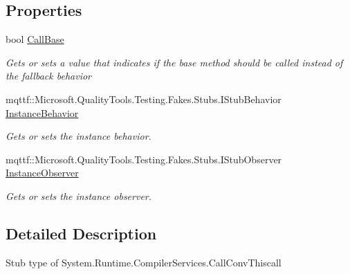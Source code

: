 \subsection*{Properties}
\begin{DoxyCompactItemize}
\item 
bool \hyperlink{class_system_1_1_runtime_1_1_compiler_services_1_1_fakes_1_1_stub_call_conv_thiscall_aa049c9c98e7fbe65ed83fddbc28c158b}{Call\-Base}
\begin{DoxyCompactList}\small\item\em Gets or sets a value that indicates if the base method should be called instead of the fallback behavior\end{DoxyCompactList}\item 
mqttf\-::\-Microsoft.\-Quality\-Tools.\-Testing.\-Fakes.\-Stubs.\-I\-Stub\-Behavior \hyperlink{class_system_1_1_runtime_1_1_compiler_services_1_1_fakes_1_1_stub_call_conv_thiscall_a7bd897b739bd968b545d89651413eb7f}{Instance\-Behavior}
\begin{DoxyCompactList}\small\item\em Gets or sets the instance behavior.\end{DoxyCompactList}\item 
mqttf\-::\-Microsoft.\-Quality\-Tools.\-Testing.\-Fakes.\-Stubs.\-I\-Stub\-Observer \hyperlink{class_system_1_1_runtime_1_1_compiler_services_1_1_fakes_1_1_stub_call_conv_thiscall_aecc63c4dab56fa89a486089916ab697b}{Instance\-Observer}
\begin{DoxyCompactList}\small\item\em Gets or sets the instance observer.\end{DoxyCompactList}\end{DoxyCompactItemize}


\subsection{Detailed Description}
Stub type of System.\-Runtime.\-Compiler\-Services.\-Call\-Conv\-Thiscall



